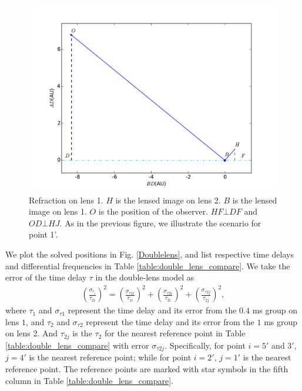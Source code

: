 \documentclass[useAMS,usenatbib]{mn2e}
\begin{document}
\begin{figure}
\centering
\includegraphics[width=1.0\linewidth]{Second_reflection.pdf}
\caption{Refraction on lens 1. 
$H$ is the lensed image on lens 2.  $B$ is the lensed image on lens 1.  $O$ is the position of the observer. $HF\bot DF$ and $OD\bot HJ$.  As in the previous figure, we illustrate the scenario for point 1'. }
\label{second_reflect}
\end{figure}



We plot the solved positions in Fig. \ref{Doublelens}, and list
respective time delays and differential frequencies in
Table \ref{table:double_lens_compare}.  
We take the error of the time delay $\tau$
in the double-lens model as
\begin{equation}
\begin{aligned}
(\frac{\sigma_{\tau_i}}{\tau_{2i}})^2 = (\frac{\sigma_{\tau1i}}{\tau_{1i}})^2+(\frac{\sigma_{\tau2i}}{\tau_{2i}})^2 + (\frac{\sigma_{\tau2j}}{\tau_{2j}})^2,
\end{aligned}
\end{equation}
where $\tau_1$ and $\sigma_{\tau1}$ represent the time delay and its
error from the $0.4$ ms group on lens $1$, and $\tau_2$ and
$\sigma_{\tau2}$ represent the time delay and its error from
the $1$ ms group on lens 2.  And $\tau_{2j}$ is the $\tau_2$ for
the nearest reference point in Table
\ref{table:double_lens_compare} with error $\sigma_{\tau2j}$.  
Specifically,
for point $i=5'$ and $3'$, $j=4'$ is the nearest reference point; while for point $i=2'$, $j=1'$ is the nearest reference point.  The reference points are marked with star symbols in the fifth column in Table \ref{table:double_lens_compare}.
\end{document}
